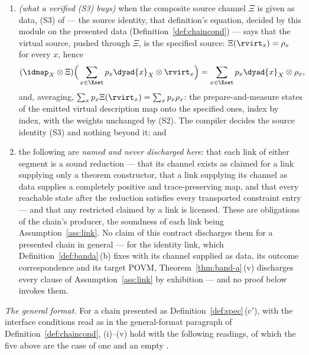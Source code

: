 \begin{theorem}
\begin{enumerate}[label=(\roman*),leftmargin=2.2em]
every physical element covered more than once by $\gamma'$ to vanish. That
trace preservation is
Assumption~\ref{ass:link}, not a check: nothing here evaluates it;
\item \emph{(what a verified (S3) buys)} when the composite source channel
$\Xi$ is given as data, (S3) of
 --- the source identity,
that definition's equation, decided by this module on the presented data
(Definition~\ref{def:chaincond}) --- says that the virtual source, pushed
through $\Xi$, is the specified source: $\Xi(\rvirt_x)=\rho_x$ for every $x$,
hence
\begin{equation}\label{eq:srcresid}
  (\idmap_X\otimes\Xi)\Big(\sum_{x\in\Xset}p_x\dyad{x}_X\otimes\rvirt_x\Big)
  =\sum_{x\in\Xset}p_x\dyad{x}_X\otimes\rho_x ,
\end{equation}
and, averaging, $\sum_xp_x\Xi(\rvirt_x)=\sum_xp_x\rho_x$: the
prepare-and-measure states of the emitted virtual description map onto the
specified ones, index by index, with the weights unchanged by (S2). The
compiler decides the source identity (S3) and nothing beyond it; and
\item the following are \emph{named and never discharged here}: that each link
of either segment is a sound reduction --- that its channel exists as claimed
for a link supplying only a theorem constructor, that a link supplying
its channel as data supplies a completely positive and trace-preserving map,
and that every reachable state after the reduction satisfies every transported
constraint entry --- and that any restricted  claimed by a
link is licensed. These are obligations of the chain's producer, the
soundness of each link being Assumption~\ref{ass:link}. No claim of this contract discharges them for a
presented chain in general --- for the  identity link, which
Definition~\ref{def:banda}\,(b) fixes with its channel supplied as data, its
outcome correspondence and its target POVM,
Theorem~\ref{thm:band-a}\,(v) discharges every clause of
Assumption~\ref{ass:link} by exhibition --- and
no proof below invokes them.
\end{enumerate}
\emph{The general format.} For a chain presented as
Definition~\ref{def:spec}\,(c$'$), with the interface conditions read as in the
general-format paragraph of Definition~\ref{def:chaincond}, (i)--(v) hold with
the following readings, of which the five above are the case of one
 and an empty .
\begin{enumerate}[label=(\roman*$'$),leftmargin=2.6em]

\end{enumerate}
\end{theorem}
